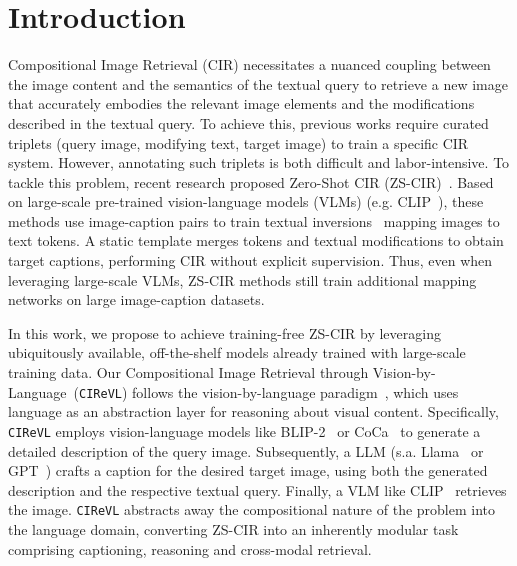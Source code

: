 \documentclass{article} \usepackage{iclr2024_conference,times}
\newcommand{\acronym}{{Compositional Image Retrieval through Vision-by-Language}}
\newcommand{\methodName}{\texttt{CIReVL}\xspace} \newcommand{\methodNameNS}{\texttt{CIReVL}}
\begin{document}
\section{Introduction}
Compositional Image Retrieval (CIR) necessitates a nuanced coupling between the image content and the semantics of the textual query to retrieve a new image that accurately embodies the relevant image elements and the modifications described in the textual query. 
To achieve this, previous works require curated triplets (query image, modifying text, target image) to train a specific CIR system.
However, annotating such triplets is both difficult and labor-intensive. To tackle this problem, recent research proposed Zero-Shot CIR (ZS-CIR)~\citep{pic2word,searle}. Based on large-scale pre-trained vision-language models (VLMs) (e.g. CLIP~\citep{clip}), these methods use image-caption pairs to train textual inversions~\citep{gal2022image,palavra} mapping images to text tokens. A static template merges tokens and textual modifications to obtain target captions, performing CIR without explicit supervision. Thus, even when leveraging large-scale VLMs, ZS-CIR methods still train additional mapping networks on large image-caption datasets.

In this work, we propose to achieve training-free ZS-CIR by leveraging ubiquitously available, off-the-shelf models already trained with large-scale training data. 
Our \acronym\ (\methodNameNS) follows the vision-by-language paradigm~\citep{zeng2022socratic,chatgptblip,languagelens,levy2023chatting}, which uses language as an abstraction layer for reasoning about visual content. 
Specifically, \methodName employs vision-language models like BLIP-2~\citep{blip2} or CoCa~\citep{coca} to generate a detailed description of the query image. 
Subsequently, a LLM (s.a. Llama~\citep{llama2} or GPT~\citep{gpt-3}) crafts a caption for the desired target image, using both the generated description and the respective textual query. Finally, a VLM like CLIP~\citep{clip} retrieves the image.  
\methodName abstracts away the compositional nature of the problem into the language domain, converting ZS-CIR into an inherently modular task comprising captioning, reasoning and cross-modal retrieval.
\end{document}
